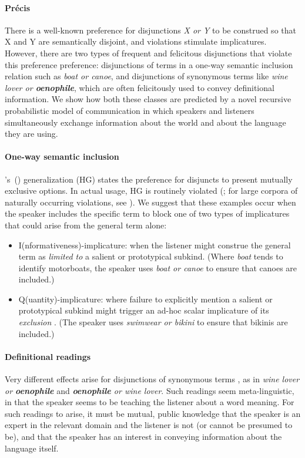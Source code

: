\documentclass[12pt]{article}
\newcommand{\word}[1]{\emph{#1}}
\newcommand{\posscitet}[1]{\citeauthor{#1}'s~(\citeyear{#1})}
\begin{document}
\paragraph{Pr{\'e}cis}
There is a well-known preference for disjunctions \word{X or Y} to be
construed so that X and Y are semantically disjoint, and violations
stimulate implicatures.  However, there are two types of frequent and
felicitous disjunctions that violate this preference preference:
disjunctions of terms in a one-way semantic inclusion relation such as
\word{boat or canoe}, and disjunctions of synonymous terms like
\word{wine lover or \textbf{oenophile}}, which are often felicitously
used to convey definitional information.  We show how both these
classes are predicted by a novel recursive probabilistic model of
communication in which speakers and listeners simultaneously exchange
information about the world and about the language they are using.

\paragraph{One-way semantic inclusion}
\posscitet{Hurford:1974} generalization (HG) states the preference for
disjuncts to present mutually exclusive options. In actual usage, HG
is routinely violated (\citealt{Rohdenburg:1985}; for large corpora of
naturally occurring violations, see
\citealt{Potts13MICH,Chemla-HurfordCounts}).  We suggest that these
examples occur when the speaker includes the specific term to block
one of two types of implicatures \citep{levinson:2000} that could arise from the general
term alone:

\begin{itemize}
\item I(nformativeness)-implicature: when the listener might 
  construe the general term as \emph{limited to} a salient or prototypical
  subkind. (Where \word{boat} tends to identify motorboats, the
  speaker uses \emph{boat or canoe} to ensure that
  canoes are included.)

\item Q(uantity)-implicature: where failure to explicitly mention a
  salient or prototypical subkind might trigger an ad-hoc scalar
  implicature of its \emph{exclusion} \citep{hirschberg:1985}. (The
  speaker uses \emph{swimwear or bikini} to ensure that bikinis are
  included.)
\end{itemize}

\paragraph{Definitional readings} Very different effects arise for
disjunctions of synonymous terms \citep{Horn89,Rohdenburg:1985}, as in
\word{wine lover or \textbf{oenophile}} and \word{\textbf{oenophile}
  or wine lover}. Such readings seem meta-linguistic, in that the
speaker seems to be teaching the listener about a word meaning. For
such readings to arise, it must be mutual, public knowledge that the
speaker is an expert in the relevant domain and the listener is not
(or cannot be presumed to be), and that the speaker has an interest in
conveying information about the language itself.
\end{document}
